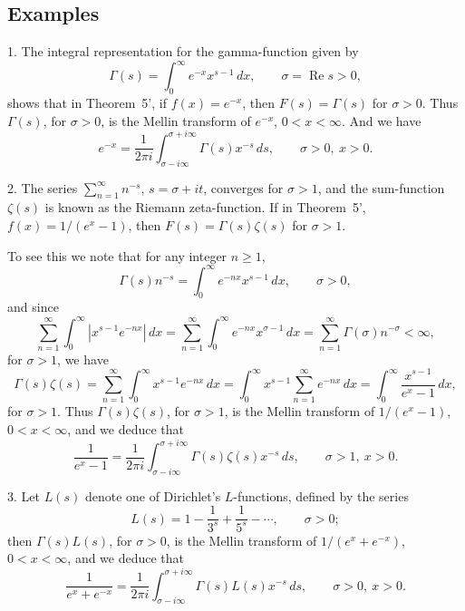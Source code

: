 \subsection*{Examples}
1. The integral representation for the gamma-function given by
\begin{equation*}
\Gamma(s)=\int_0^\infty e^{-x}x^{s-1}\,dx,\qquad \sigma=\operatorname{Re}s>0,
\end{equation*}
shows that in Theorem~5', if $f(x)=e^{-x}$, then $F(s)=\Gamma(s)$ for $\sigma>0$. Thus $\Gamma(s)$, for $\sigma>0$, is the Mellin transform of $e^{-x}$, $0<x<\infty$. And we have
\begin{equation*}
e^{-x}=\frac{1}{2\pi i}\int_{\sigma-i\infty}^{\sigma+i\infty}\Gamma(s)x^{-s}\,ds,
\qquad\sigma>0,\ x>0.
\end{equation*}

2. The series $\sum_{n=1}^\infty n^{-s}$, $s=\sigma+it$, converges for $\sigma>1$, and the sum-function $\zeta(s)$ is known as the Riemann zeta-function. If in Theorem~5', $f(x)=1/(e^x-1)$, then $F(s)=\Gamma(s)\zeta(s)$ for $\sigma>1$.

To see this we note that for any integer $n\ge 1$,
\begin{equation*}
\Gamma(s)n^{-s}=\int_0^\infty e^{-nx}x^{s-1}\,dx,\qquad\sigma>0,
\end{equation*}
and since
\begin{equation*}
\sum_{n=1}^\infty\int_0^\infty|x^{s-1}e^{-nx}|\,dx
=\sum_{n=1}^\infty\int_0^\infty e^{-nx}x^{\sigma-1}\,dx
=\sum_{n=1}^\infty\Gamma(\sigma)n^{-\sigma}<\infty,
\end{equation*}
for $\sigma>1$, we have
\begin{equation*}
\Gamma(s)\zeta(s)=\sum_{n=1}^\infty\int_0^\infty x^{s-1}e^{-nx}\,dx
=\int_0^\infty x^{s-1}\sum_{n=1}^\infty e^{-nx}\,dx
=\int_0^\infty\frac{x^{s-1}}{e^x-1}\,dx,
\end{equation*}
for $\sigma>1$. Thus $\Gamma(s)\zeta(s)$, for $\sigma>1$, is the Mellin transform of $1/(e^x-1)$, $0<x<\infty$, and we deduce that
\begin{equation*}
\frac{1}{e^x-1}=\frac{1}{2\pi i}\int_{\sigma-i\infty}^{\sigma+i\infty}\Gamma(s)\zeta(s)x^{-s}\,ds,
\qquad\sigma>1,\ x>0.
\end{equation*}

3. Let $L(s)$ denote one of Dirichlet's $L$-functions, defined by the series
\begin{equation*}
L(s)=1-\frac{1}{3^s}+\frac{1}{5^s}-\cdots,\qquad\sigma>0;
\end{equation*}
then $\Gamma(s)L(s)$, for $\sigma>0$, is the Mellin transform of $1/(e^x+e^{-x})$, $0<x<\infty$, and we deduce that
\begin{equation*}
\frac{1}{e^x+e^{-x}}=\frac{1}{2\pi i}\int_{\sigma-i\infty}^{\sigma+i\infty}\Gamma(s)L(s)x^{-s}\,ds,
\qquad\sigma>0,\ x>0.
\end{equation*}

